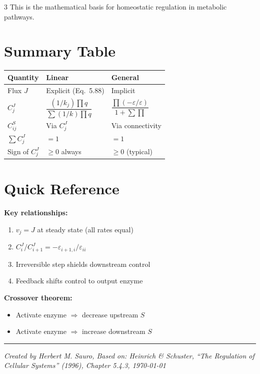 \documentclass[10pt,landscape,a4paper]{article}
\begin{document}
\begin{multicols}{3}
\vspace{4pt}
This is the mathematical basis for homeostatic regulation in metabolic pathways.

\section{Summary Table}

\begin{center}
\footnotesize
\begin{tabular}{@{}lll@{}}
\toprule
\textbf{Quantity} & \textbf{Linear} & \textbf{General} \\
\midrule
Flux $J$ & Explicit (Eq.~5.88) & Implicit \\[5pt]
$C_j^J$ & $\displaystyle\dfrac{(1/k_j)\prod q}{\sum(1/k)\prod q}$ & $\displaystyle\dfrac{\prod(-\varepsilon/\varepsilon)}{1+\sum\prod}$ \\[14pt]
$C_{ij}^S$ & Via $C_j^J$ & Via connectivity \\[5pt]
$\sum C_j^J$ & $= 1$ & $= 1$ \\[5pt]
Sign of $C_j^J$ & $\geq 0$ always & $\geq 0$ (typical) \\
\bottomrule
\end{tabular}
\end{center}

\section{Quick Reference}

\textbf{Key relationships:}
\begin{enumerate}
\item $v_j = J$ at steady state (all rates equal)
\item $C_i^J/C_{i+1}^J = -\varepsilon_{i+1,i}/\varepsilon_{ii}$
\item Irreversible step shields downstream control
\item Feedback shifts control to output enzyme
\end{enumerate}

\textbf{Crossover theorem:}
\begin{itemize}
\item Activate enzyme $\Rightarrow$ decrease upstream $S$
\item Activate enzyme $\Rightarrow$ increase downstream $S$
\end{itemize}

\vfill
\hrule
\vspace{3pt}
\footnotesize
\textit{Created by Herbert M. Sauro, Based on: Heinrich \& Schuster, ``The Regulation of Cellular Systems'' (1996), Chapter 5.4.3, \today}

\end{multicols}
\end{document}

